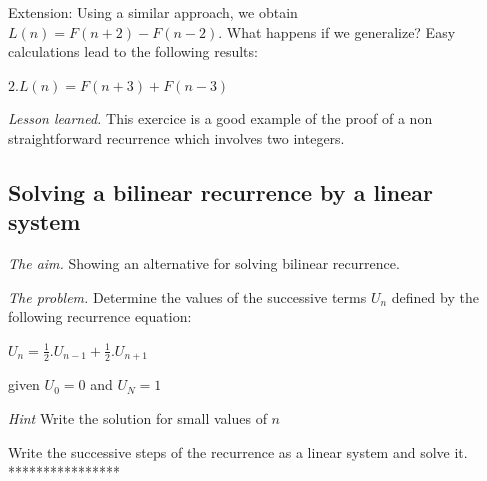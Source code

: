{Extension:
Using a similar approach, we obtain $L(n) = F(n+2)-F(n-2)$. 
What happens if we generalize? Easy calculations lead to the following results:
\medskip

$2.L(n) = F(n+3) + F(n-3) $

%
%
%
%
%
%
%
%
%
%
%
%
%
% 
%
%
%
%
%
%
%
%

\noindent \textit{Lesson learned.}
This exercice is a good example of the proof of a non straightforward recurrence which involves two integers.

\subsection{Solving a bilinear recurrence by a linear system}

\noindent \textit{The aim.}
Showing an alternative for solving bilinear recurrence.
\medskip

\noindent \textit{The problem.}
Determine the values of the successive terms $U_n$ defined by the following recurrence equation:

$U_{n} = \frac{1}{2}.U_{n-1} + \frac{1}{2}.U_{n+1}$

given $U_0 = 0$ and $U_N = 1$
\medskip

\noindent \textit{Hint}
Write the solution for small values of $n$

Write the successive steps of the recurrence as a linear system and solve it.
****************}
